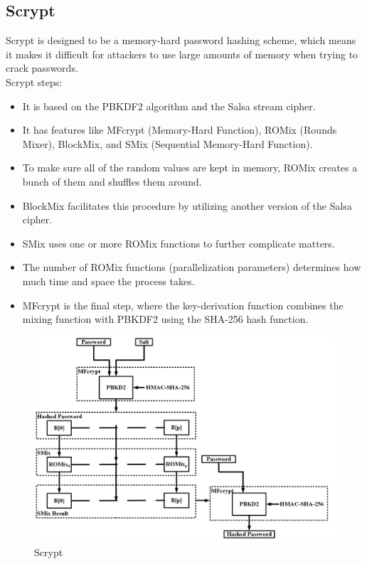 \documentclass[10pt,oneside,english,a4paper]{article}
\begin{document}
\subsection{Scrypt}
Scrypt is designed to be a memory-hard password hashing scheme, which means it makes it difficult for attackers to use large amounts of memory when trying to crack passwords.\\
Scrypt steps: 
\begin{itemize}
\item It is based on the PBKDF2 algorithm and the Salsa stream cipher.
\item It has features like 
MFcrypt (Memory-Hard Function), 
ROMix (Rounds Mixer), 
BlockMix, and 
SMix (Sequential Memory-Hard Function).

\item To make sure all of the random values are kept in memory, ROMix creates a  bunch of them and shuffles them around.
\item BlockMix facilitates this procedure by utilizing another version of the Salsa cipher.
\item SMix uses one or more ROMix functions to further complicate matters.
\item The number of ROMix functions (parallelization parameters) determines how much time and space the process takes.
\item MFcrypt is the final step, where the key-derivation function combines the mixing function with PBKDF2 using the SHA-256 hash function.
\end{itemize}

\begin{figure}[h]
	\centering
	\includegraphics[scale = 0.10]{Scrypt2.png}
	\caption{Scrypt}
	\label{}
\end{figure}
\end{document}
